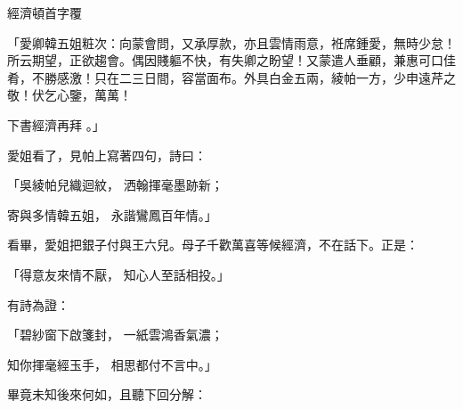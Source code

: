 \begin{showcontents}{}
經濟頓首字覆

「愛卿韓五姐粧次：向蒙會問，又承厚款，亦且雲情雨意，袵席鍾愛，無時少怠！所云期望，正欲趨會。偶因賤軀不快，有失卿之盼望！又蒙遣人垂顧，兼惠可口佳肴，不勝感激！只在二三日間，容當面布。外具白金五兩，綾帕一方，少申遠芹之敬！伏乞心鑒，萬萬！

下書經濟再拜   。」

愛姐看了，見帕上寫著四句，詩曰：

「吳綾帕兒織迴紋，  洒翰揮毫墨跡新；

寄與多情韓五姐，  永諧鸞鳳百年情。」

看畢，愛姐把銀子付與王六兒。母子千歡萬喜等候經濟，不在話下。正是：

「得意友來情不厭，  知心人至話相投。」

有詩為證：

「碧紗窗下啟箋封，  一紙雲鴻香氣濃；

知你揮毫經玉手，  相思都付不言中。」

畢竟未知後來何如，且聽下回分解：





\end{showcontents}


